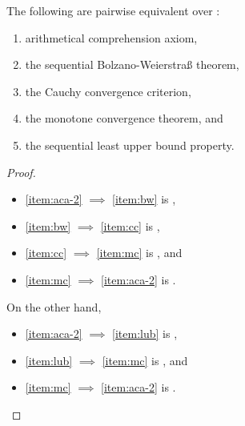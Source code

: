 \documentclass[../main.tex]{memoir}
\begin{document}
\begin{theorem}
  \label{thm:aca-equivalences}

  The following are pairwise equivalent over \rca:

  \begin{enumerate}[label=(\roman*), ref=(\roman*)]
  \item \label{item:aca-2} arithmetical comprehension axiom,
  \item \label{item:bw} the sequential Bolzano-Weierstra{\ss} theorem,
  \item \label{item:cc} the Cauchy convergence criterion,
  \item \label{item:mc} the monotone convergence theorem, and
  \item \label{item:lub} the sequential least upper bound property.
  \end{enumerate}
\end{theorem}
\begin{proof}
  \begin{itemize}
  \item \ref{item:aca-2} $\implies$ \ref{item:bw} is ,
  \item \ref{item:bw} $\implies$ \ref{item:cc} is ,
  \item \ref{item:cc} $\implies$ \ref{item:mc} is , and
  \item \ref{item:mc} $\implies$ \ref{item:aca-2} is .
  \end{itemize}

  On the other hand,

  \begin{itemize}
  \item \ref{item:aca-2} $\implies$ \ref{item:lub} is ,
  \item \ref{item:lub} $\implies$ \ref{item:mc} is , and
  \item \ref{item:mc} $\implies$ \ref{item:aca-2} is .
  \end{itemize}
\end{proof}
\end{document}
